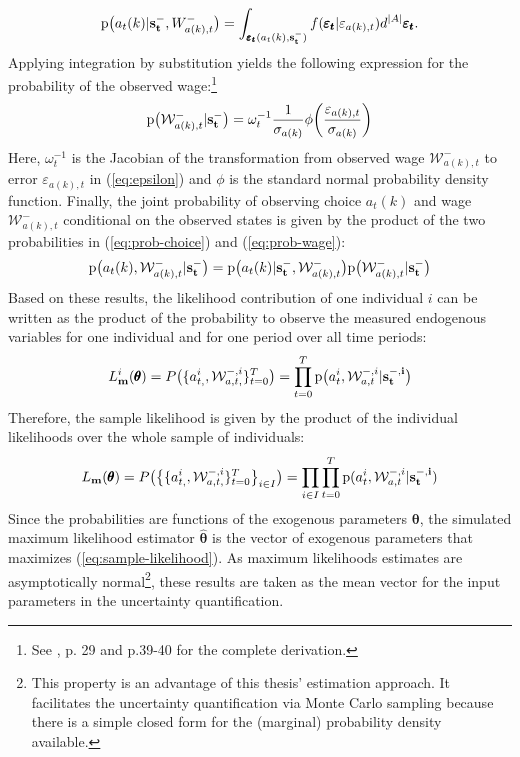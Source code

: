\noindent
\begin{align} \label{eq:prob-choice}
\text{p}\big(a_t(k) | \bold{s_t^-},W^{-}_{a(k),t}\big) = \int_{\pmb{\varepsilon_t}(a_t(k),\bold{s_t^-})} f(\pmb{\varepsilon_t}|\varepsilon_{a(k),t}) d^{|A|} \pmb{\varepsilon_t}.
\end{align}
Applying integration by substitution yields the following expression for the probability of the observed wage:\footnote{See \cite{Raabe.2019}, p. 29 and p.39-40 for the complete derivation.}
\begin{align} \label{eq:prob-wage}
\text{p}\big(\mathcal{W}^{-}_{a(k),t} | \bold{s_t^-}\big) = \omega_t^{-1} \frac{1}{\sigma_{a(k)}} \phi\bigg(\frac{\varepsilon_{a(k),t}}{\sigma_{a(k)}}\bigg)
\end{align}
Here, $\omega_t^{-1}$ is the Jacobian of the transformation from observed wage $\mathcal{W}^{-}_{a(k),t}$ to error $\varepsilon_{a(k),t}$ in (\ref{eq:epsilon}) and $\phi$ is the standard normal probability density function.
Finally, the joint probability of observing choice $a_t(k)$ and wage $\mathcal{W}^{-}_{a(k),t}$ conditional on the observed states is given by the product of the two probabilities in (\ref{eq:prob-choice}) and (\ref{eq:prob-wage}):
\begin{align}
\text{p}\big(a_t(k),\mathcal{W}^{-}_{a(k),t}|\bold{s_t^-}\big) = \text{p}\big(a_t(k)|\bold{s_t^-}, \mathcal{W}^{-}_{a(k),t}\big)\text{p}\big(\mathcal{W}^{-}_{a(k),t}|\bold{s_t^-}\big)
\end{align}
Based on these results, the likelihood contribution of one individual $i$ can be written as the product of the probability to observe the measured endogenous variables for one individual and for one period over all time periods:
\begin{align}
L^{i}_{\bold{m}}(\pmb{\theta}) = P\big(\{a_{t,}^{i},\mathcal{W}^{-,i}_{a,t,}\}_{t=0}^T\big) = \prod_{t=0}^{T} \text{p}\big(a_t^{i},\mathcal{W}_{a,t}^{-,i}|\bold{s_t^{-,i}}\big)
\end{align}
Therefore, the sample likelihood is given by the product of the individual likelihoods over the whole sample of individuals:
\begin{align} \label{eq:sample-likelihood}
L_{\bold{m}}(\pmb{\theta}) = P\big(\big\{\{a_{t,}^{i},\mathcal{W}^{-,i}_{a,t,}\}_{t=0}^T\big\}_{i \in I}\big) = \prod_{i \in I}\prod_{t=0}^{T} \text{p}(a_t^{i},\mathcal{W}_{a,t}^{-,i}|\bold{s_t^{-,i})}
\end{align}
Since the probabilities are functions of the exogenous parameters $\pmb{\theta}$, the simulated maximum likelihood estimator $\pmb{\hat{\theta}}$ is the vector of exogenous parameters that maximizes (\ref{eq:sample-likelihood}). As maximum likelihoods estimates are asymptotically normal\footnote{This property is an advantage of this thesis' estimation approach. It facilitates the uncertainty quantification via Monte Carlo sampling because there is a simple closed form for the (marginal) probability density available.}, these results are taken as the mean vector for the input parameters in the uncertainty quantification.

